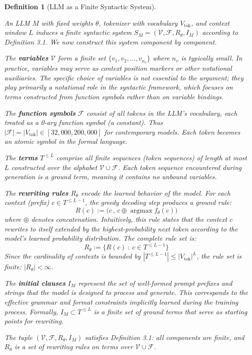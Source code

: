 \documentclass[11pt]{article}
\newtheorem{definition}[theorem]{Definition}
\begin{document}
\begin{definition}[LLM as a Finite Syntactic System]
\label{def:llm_syntactic}

An LLM $M$ with fixed weights $\theta$, tokenizer with vocabulary $V_{\text{tok}}$, and context window $L$ induces a finite syntactic system $S_M = (\mathcal{V}, \mathcal{F}, R_\theta, I_M)$ according to Definition 3.1. We now construct this system component by component.

The \textbf{variables} $\mathcal{V}$ form a finite set $\{v_1, v_2, \ldots, v_{n_v}\}$ where $n_v$ is typically small. In practice, variables may serve as context position markers or other notational auxiliaries. The specific choice of variables is not essential to the argument; they play primarily a notational role in the syntactic framework, which focuses on terms constructed from function symbols rather than on variable bindings.

The \textbf{function symbols} $\mathcal{F}$ consist of all tokens in the LLM's vocabulary, each treated as a 0-ary function symbol (a constant). Thus $|\mathcal{F}| = |V_{\text{tok}}| \in [32{,}000, 200{,}000]$ for contemporary models. Each token becomes an atomic symbol in the formal language.

The \textbf{terms} $T^{\le L}$ comprise all finite sequences (token sequences) of length at most $L$ constructed over the alphabet $\mathcal{V} \cup \mathcal{F}$. Each token sequence encountered during generation is a ground term, meaning it contains no unbound variables.

The \textbf{rewriting rules} $R_\theta$ encode the learned behavior of the model. For each context (prefix) $c \in T^{\le L-1}$, the greedy decoding step produces a ground rule:
\begin{equation}
R(c) := \bigl(c \, , \, c \oplus \operatorname{argmax} f_\theta(c)\bigr)
\end{equation}
where $\oplus$ denotes concatenation. Intuitively, this rule states that the context $c$ rewrites to itself extended by the highest-probability next token according to the model's learned probability distribution. The complete rule set is:
\begin{equation}
R_\theta := \bigl\{ R(c) \: : \: c \in T^{\le L-1} \bigr\}
\end{equation}
Since the cardinality of contexts is bounded by $|T^{\le L-1}| \le |V_{\text{tok}}|^L$, the rule set is finite: $|R_\theta| < \infty$.

The \textbf{initial clauses} $I_M$ represent the set of well-formed prompt prefixes and strings that the model is designed to process and generate. This corresponds to the effective grammar and format constraints implicitly learned during the training process. Formally, $I_M \subset T^{\le L}$ is a finite set of ground terms that serve as starting points for rewriting.

The tuple $(\mathcal{V}, \mathcal{F}, R_\theta, I_M)$ satisfies Definition 3.1: all components are finite, and $R_\theta$ is a set of rewriting rules on terms over $\mathcal{V} \cup \mathcal{F}$.

\end{definition}
\end{document}
